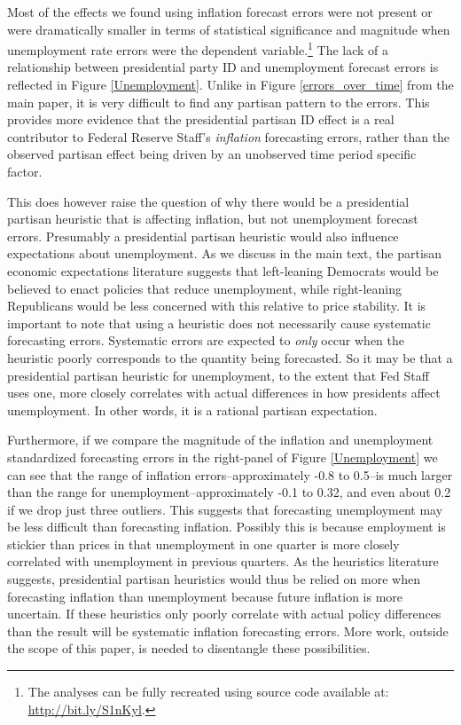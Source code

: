 \documentclass[a4paper]{article}\usepackage[]{graphicx}\usepackage[]{color}
\begin{document}
Most of the effects we found using inflation forecast errors were not present or were dramatically smaller in terms of statistical significance and magnitude when unemployment rate errors were the dependent variable.\footnote{The analyses can be fully recreated using source code available at: \url{http://bit.ly/S1nKyl}.} The lack of a relationship between presidential party ID and unemployment forecast errors is reflected in Figure \ref{Unemployment}. Unlike in Figure \ref{errors_over_time} from the main paper, it is very difficult to find any partisan pattern to the errors. This provides more evidence that the presidential partisan ID effect is a real contributor to Federal Reserve Staff's \emph{inflation} forecasting errors, rather than the observed partisan effect being driven by an unobserved time period specific factor.

This does however raise the question of why there would be a presidential partisan heuristic that is affecting inflation, but not unemployment forecast errors. Presumably a presidential partisan heuristic would also influence expectations about unemployment. As we discuss in the main text, the partisan economic expectations literature suggests that left-leaning Democrats would be believed to enact policies that reduce unemployment, while right-leaning Republicans would be less concerned with this relative to price stability. It is important to note that using a heuristic does not necessarily cause systematic forecasting errors. Systematic errors are expected to \emph{only} occur when the heuristic poorly corresponds to the quantity being forecasted. So it may be that a presidential partisan heuristic for unemployment, to the extent that Fed Staff uses one, more closely correlates with actual differences in how presidents affect unemployment. In other words, it is a rational partisan expectation.

Furthermore, if we compare the magnitude of the inflation and unemployment standardized forecasting errors in the right-panel of Figure \ref{Unemployment} we can see that the range of inflation errors--approximately -0.8 to 0.5--is much larger than the range for unemployment--approximately -0.1 to 0.32, and even about 0.2 if we drop just three outliers. This suggests that forecasting unemployment may be less difficult than forecasting inflation. Possibly this is because employment is stickier than prices in that unemployment in one quarter is more closely correlated with unemployment in previous quarters. As the heuristics literature suggests, presidential partisan heuristics would thus be relied on more when forecasting inflation than unemployment because future inflation is more uncertain. If these heuristics only poorly correlate with actual policy differences than the result will be systematic inflation forecasting errors. More work, outside the scope of this paper, is needed to disentangle these possibilities.  
\end{document}
